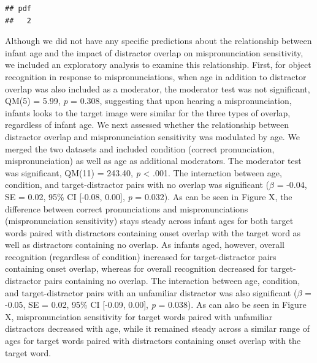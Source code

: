 \documentclass[man]{apa6}
\theoremstyle{definition}
\theoremstyle{definition}
\theoremstyle{definition}
\theoremstyle{remark}
\begin{document}
\begin{verbatim}
## pdf 
##   2
\end{verbatim}

Although we did not have any specific predictions about the relationship
between infant age and the impact of distractor overlap on
mispronunciation sensitivity, we included an exploratory analysis to
examine this relationship. First, for object recognition in response to
mispronunciations, when age in addition to distractor overlap was also
included as a moderator, the moderator test was not significant, QM(5) =
5.99, \emph{p} = 0.308, suggesting that upon hearing a mispronunciation,
infants looks to the target image were similar for the three types of
overlap, regardless of infant age. We next assessed whether the
relationship between distractor overlap and mispronunciation sensitivity
was modulated by age. We merged the two datasets and included condition
(correct pronunciation, mispronunciation) as well as age as additional
moderators. The moderator test was significant, QM(11) = 243.40,
\emph{p} \textless{} .001. The interaction between age, condition, and
target-distractor pairs with no overlap was significant (\(\beta\) =
-0.04, SE = 0.02, 95\% CI {[}-0.08, 0.00{]}, \emph{p} = 0.032). As can
be seen in Figure X, the difference between correct pronunciations and
mispronunciations (mispronunciation sensitivity) stays steady across
infant ages for both target words paired with distractors containing
onset overlap with the target word as well as distractors containing no
overlap. As infants aged, however, overall recognition (regardless of
condition) increased for target-distractor pairs containing onset
overlap, whereas for overall recognition decreased for target-distractor
pairs containing no overlap. The interaction between age, condition, and
target-distractor pairs with an unfamiliar distractor was also
significant (\(\beta\) = -0.05, SE = 0.02, 95\% CI {[}-0.09, 0.00{]},
\emph{p} = 0.038). As can also be seen in Figure X, mispronunciation
sensitivity for target words paired with unfamiliar distractors
decreased with age, while it remained steady across a similar range of
ages for target words paired with distractors containing onset overlap
with the target word.
\end{document}
